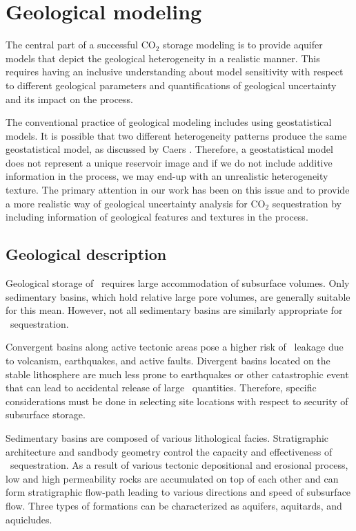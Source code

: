 \section{Geological modeling}
\label{sec:GeologicalModeling}

The central part of a successful $\mbox{CO}_2$ storage modeling is to
provide aquifer models that depict the geological heterogeneity in a
realistic manner. This requires having an inclusive understanding about model
sensitivity with respect to different geological parameters and quantifications
of geological uncertainty and its impact on the process. 

The conventional practice of geological modeling includes using geostatistical
models. It is possible that two different heterogeneity patterns produce the
same geostatistical model, as discussed by Caers \cite{caers2002multiple}.
Therefore, a geostatistical model does not represent a unique reservoir image
and if we do not include additive information in the process, we may end-up
with an unrealistic heterogeneity
texture\cite{caers2002multiple,eaton2006importance}. The primary  attention in
our work has been on this issue and to provide a more realistic way of
geological uncertainty analysis for $\mbox{CO}_2$ sequestration by including
information of geological features and textures in the process. 


\subsection{Geological description}

Geological storage of \coo\ requires large accommodation of subsurface volumes. Only sedimentary basins, which hold relative large pore volumes, are generally suitable for this mean. However, not all sedimentary basins are similarly appropriate for \coo\ sequestration.

Convergent basins along active tectonic areas pose a higher risk of \coo\ leakage due to volcanism, earthquakes, and active faults. Divergent basins located on the stable lithosphere are much less prone to earthquakes or other catastrophic event that can lead to accidental release of large \coo\ quantities. Therefore, specific considerations must be done in selecting site locations with respect to security of subsurface storage.

Sedimentary basins are composed of various lithological facies. Stratigraphic architecture and sandbody geometry control the capacity and effectiveness of \coo\ sequestration. As a result of various tectonic depositional and erosional process, low and high permeability rocks are accumulated on top of each other and can form stratigraphic flow-path leading to various directions and speed of subsurface flow. Three types of formations can be characterized as aquifers, aquitards, and aquicludes. 

